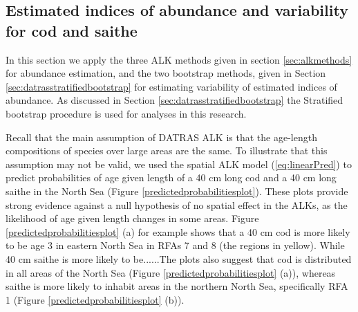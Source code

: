 \documentclass[a4paper 12pt]{article}
\numberwithin{equation}{section}
\begin{document}
\subsection{Estimated indices of abundance and variability for cod and saithe}
\label{sec:codresults}

In this section we apply the three ALK methods given in section \ref{sec:alkmethods} for abundance estimation, and the two bootstrap methods, given in Section \ref{sec:datrasstratifiedbootstrap} for estimating variability of estimated indices of abundance. As discussed in Section \ref{sec:datrasstratifiedbootstrap} the Stratified bootstrap procedure is used for analyses in this research.

Recall that the main assumption of DATRAS ALK is that the age-length compositions of species over large areas are the same. To illustrate that this assumption may not be valid, we used  the spatial ALK model (\ref{eq:linearPred}) to predict probabilities of age given length of a 40 cm long cod and a 40 cm long saithe in the North Sea (Figure \ref{predictedprobabilitiesplot}). These plots provide strong evidence against a null hypothesis of no spatial effect in the ALKs, as the likelihood of age given length changes in some areas. Figure \ref{predictedprobabilitiesplot} (a) for example shows that a 40 cm cod is more likely to be age 3 in eastern North Sea in RFAs 7 and 8 (the regions in yellow). While 40 cm saithe is more likely to be......The plots also suggest that cod is distributed in all areas of the North Sea (Figure \ref{predictedprobabilitiesplot} (a)), whereas saithe is more likely to inhabit areas in the northern North Sea, specifically RFA 1 (Figure \ref{predictedprobabilitiesplot} (b)). 
\end{document}
